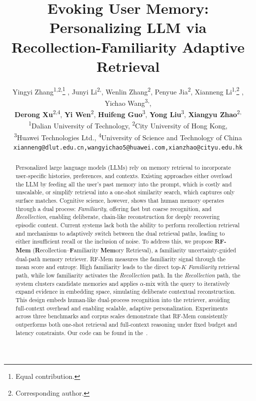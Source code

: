 \documentclass{article} %
\title{Evoking User Memory: Personalizing LLM via Recollection-Familiarity Adaptive Retrieval}
\author{Yingyi Zhang\textsuperscript{\rm{1,2,}}\thanks{Equal contribution.} , 
    Junyi  Li\textsuperscript{\rm {2,}}\footnotemark[1] , 
    Wenlin Zhang\textsuperscript{\rm{2}}, 
    Penyue Jia\textsuperscript{\rm{2}}, 
    Xianneng Li\textsuperscript{\rm{1,}}\thanks{Corresponding author.} , 
    Yichao Wang\textsuperscript{\rm{3,}}\footnotemark[2] ,\\
    \textbf{Derong Xu}\textsuperscript{\rm {2,4}}, 
    \textbf{Yi Wen}\textsuperscript{\rm {2}}, 
    \textbf{Huifeng Guo}\textsuperscript{\rm 3}, 
    \textbf{Yong Liu}\textsuperscript{\rm 3}, 
    \textbf{Xiangyu Zhao}\textsuperscript{\rm {2,}}\footnotemark[2]\\
    \textsuperscript{\rm 1}Dalian University of Technology,
    \textsuperscript{\rm 2}City University of Hong Kong, \\
    \textsuperscript{\rm 3}Huawei Technologies Ltd.,
    \textsuperscript{\rm 4}University of Science and Technology of China\\
    \texttt{xianneng@dlut.edu.cn,wangyichao5@huawei.com,xianzhao@cityu.edu.hk}
}
\newcommand{\yc}[1]{{\color{purple} [yichao: #1]}}
\newcommand{\yy}[1]{{\color{black} #1}}
\begin{document}
\maketitle

\begin{abstract}
Personalized large language models (LLMs) rely on memory retrieval to incorporate user-specific histories, preferences, and contexts. Existing approaches either overload the LLM by feeding all the user's past memory into the prompt, which is costly and unscalable, or simplify retrieval into a one-shot similarity search, which captures only surface matches. Cognitive science, however, shows that human memory operates through a dual process: \emph{Familiarity}, offering fast but coarse recognition, and \emph{Recollection}, enabling deliberate, chain-like reconstruction for deeply recovering episodic content. 
Current systems lack both the ability to perform recollection retrieval and mechanisms to adaptively switch between the dual retrieval paths, leading to either insufficient recall or the inclusion of noise.
To address this, we propose \textbf{RF-Mem} (\textbf{R}ecollection–\textbf{F}amiliarity \textbf{Mem}ory Retrieval), a familiarity uncertainty-guided dual-path memory retriever. 
RF-Mem measures the familiarity signal through the mean score and entropy. High familiarity leads to the direct top-$K$ \emph{Familiarity} retrieval path, while low familiarity activates the \emph{Recollection} path. In the \emph{Recollection} path, the system clusters candidate memories and applies $\alpha$-mix with the query to iteratively expand evidence in embedding space, simulating deliberate contextual reconstruction.
This design embeds human-like dual-process recognition into the retriever, avoiding full-context overhead and enabling scalable, adaptive personalization. Experiments across three benchmarks and corpus scales demonstrate that RF-Mem consistently outperforms both one-shot retrieval and full-context reasoning under fixed budget and latency constraints. Our code can be found in the~.

\end{abstract}
\end{document}
